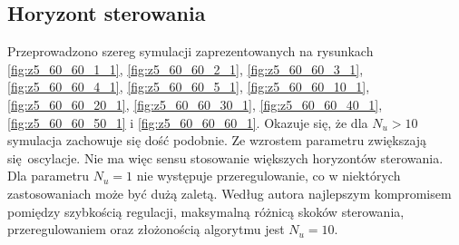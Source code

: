\documentclass[a4paper, 10pt]{article}
\begin{document}
	\subsection{Horyzont sterowania}
	Przeprowadzono szereg symulacji zaprezentowanych na rysunkach \ref{fig:z5_60_60_1_1}, \ref{fig:z5_60_60_2_1}, \ref{fig:z5_60_60_3_1}, \ref{fig:z5_60_60_4_1}, \ref{fig:z5_60_60_5_1}, \ref{fig:z5_60_60_10_1}, \ref{fig:z5_60_60_20_1}, \ref{fig:z5_60_60_30_1}, \ref{fig:z5_60_60_40_1}, \ref{fig:z5_60_60_50_1} i 
	\ref{fig:z5_60_60_60_1}. Okazuje się, że dla $N_u > 10 $ symulacja zachowuje się dość podobnie. Ze wzrostem parametru zwiększają się oscylacje. Nie ma więc sensu stosowanie większych horyzontów sterowania. Dla parametru $N_u = 1$ nie występuje przeregulowanie, co w niektórych zastosowaniach może być dużą zaletą.
	Według autora najlepszym kompromisem pomiędzy szybkością regulacji, maksymalną różnicą skoków sterowania, przeregulowaniem oraz złożonością algorytmu jest $N_u = 10$.
\end{document}
